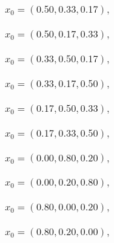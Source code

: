 \documentclass[a4paper]{article}
\begin{document}
\begin{multicols*}{2}
   \subsubsection{\(x_0 = (0.50,0.33,0.17),\quad \)}
   

   \subsubsection{\(x_0 = (0.50,0.17,0.33),\quad \)}
   

   \subsubsection{\(x_0 = (0.33,0.50,0.17),\quad \)}
   

   \subsubsection{\(x_0 = (0.33,0.17,0.50),\quad \)}
   

   \subsubsection{\(x_0 = (0.17,0.50,0.33),\quad \)}
   

   \subsubsection{\(x_0 = (0.17,0.33,0.50),\quad \)}
   

   \subsubsection{\(x_0 = (0.00,0.80,0.20),\quad \)}
   

   \subsubsection{\(x_0 = (0.00,0.20,0.80),\quad \)}
   

   \subsubsection{\(x_0 = (0.80,0.00,0.20),\quad \)}
   

   \subsubsection{\(x_0 = (0.80,0.20,0.00),\quad \)}
   


\end{multicols*}
\end{document}
